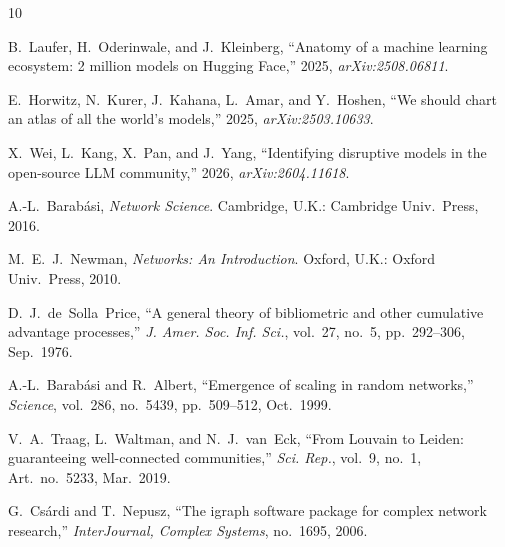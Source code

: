 \documentclass[conference]{IEEEtran}
\begin{document}
\begin{thebibliography}{10}

B.~Laufer, H.~Oderinwale, and J.~Kleinberg, ``Anatomy of a machine learning
ecosystem: 2 million models on Hugging Face,'' 2025, \emph{arXiv:2508.06811}.

E.~Horwitz, N.~Kurer, J.~Kahana, L.~Amar, and Y.~Hoshen, ``We should chart an
atlas of all the world's models,'' 2025, \emph{arXiv:2503.10633}.

X.~Wei, L.~Kang, X.~Pan, and J.~Yang, ``Identifying disruptive models in the
open-source LLM community,'' 2026, \emph{arXiv:2604.11618}.

A.-L.~Barab\'asi, \emph{Network Science}. Cambridge, U.K.: Cambridge Univ.\
Press, 2016.

M.~E.~J.~Newman, \emph{Networks: An Introduction}. Oxford, U.K.: Oxford Univ.\
Press, 2010.

D.~J.~de~Solla~Price, ``A general theory of bibliometric and other cumulative
advantage processes,'' \emph{J. Amer. Soc. Inf. Sci.}, vol.~27, no.~5,
pp.~292--306, Sep.\ 1976.

A.-L.~Barab\'asi and R.~Albert, ``Emergence of scaling in random networks,''
\emph{Science}, vol.~286, no.~5439, pp.~509--512, Oct.\ 1999.

V.~A.~Traag, L.~Waltman, and N.~J.~van~Eck, ``From Louvain to Leiden:
guaranteeing well-connected communities,'' \emph{Sci. Rep.}, vol.~9, no.~1, Art.~no.~5233,
Mar.\ 2019.

G.~Cs\'ardi and T.~Nepusz, ``The igraph software package for complex network
research,'' \emph{InterJournal, Complex Systems}, no.~1695, 2006.

\end{thebibliography}
\end{document}
